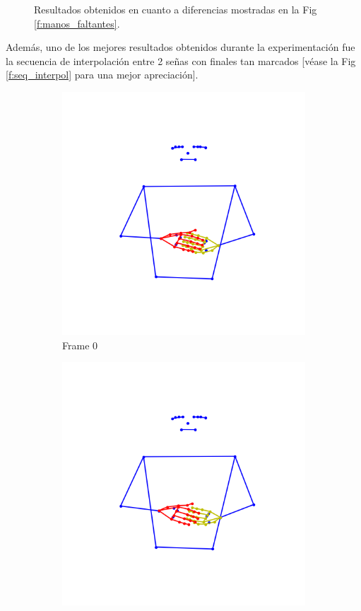 \begin{figure}[t]
	
	\caption{Resultados obtenidos en cuanto a diferencias mostradas en la Fig \ref{f:manos_faltantes}.}
	\label{f:no_manos_faltantes}
	\end{figure}
	
Además, uno de los mejores resultados obtenidos durante la experimentación fue la secuencia de interpolación entre 2 señas con finales tan marcados [véase la Fig \ref{f:seq_interpol} para una mejor apreciación].
	\begin{figure}[t]
\centering
	\begin{subfigure}[t]{0.3\textwidth}
	\centering
		\includegraphics[align=t,width=0.9\linewidth, height =0.9\linewidth]{Graphics/interpol_aborto_amar_0.png}
		\caption{ Frame 0}
		\label{f:frame0}
	\end{subfigure}
	\begin{subfigure}[t]{0.3\textwidth}
	\centering
		\includegraphics[align=t,width=0.9\linewidth, height =0.9\linewidth]{Graphics/interpol_aborto_amar_1.png}

\end{subfigure}
\end{figure}
